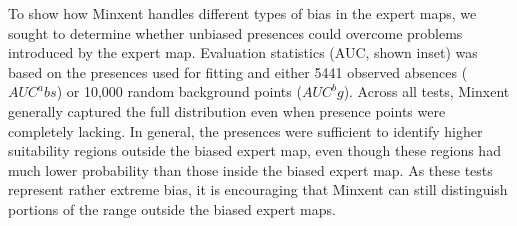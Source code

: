 To show how Minxent handles different types of bias in the expert maps, we sought to determine whether unbiased presences could overcome problems introduced by the expert map. Evaluation statistics (AUC, shown inset) was based on the presences used for fitting and either 5441 observed absences ($AUC^abs$) or 10,000 random background points ($AUC^bg$). Across all tests, Minxent generally captured the full distribution even when presence points were completely lacking.  In general, the presences were sufficient to identify higher suitability regions outside the biased expert map, even though these regions had much lower probability than those inside the biased expert map. As these tests represent rather extreme bias, it is encouraging that Minxent can still distinguish portions of the range outside the biased expert maps. 


\listoffixmes